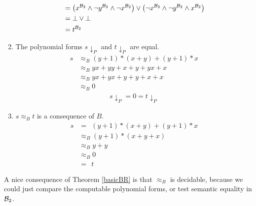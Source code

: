 \begin{enumerate}
\begin{align*}
				& =\left( x^{\mathcal{B}_2}\wedge\neg y^{\mathcal{B}_2}\wedge \neg x^{\mathcal{B}_2}\right)\vee\left( \neg x^{\mathcal{B}_2}\wedge \neg y^{\mathcal{B}_2}\wedge x^{\mathcal{B}_2}\right)                                                                                             \\
				& =\bot\vee\bot\\
				& =t^{\mathcal{B}_2} 
			\end{align*}
			\item The polynomial forms $s{\downarrow_P}$ and $t{\downarrow_P}$ are equal.
			\begin{align*}
				s & \approx_B (y+1)*(x+y)+(y+1)*x \\
				  & \approx_B yx+yy+x+y+yx+x    \\
				  & \approx_B yx+yx+y+y+x+x     \\
				  & \approx_B 0
			\end{align*}
			\begin{align*}
				s{\downarrow_P}=0=t{\downarrow_P}
			\end{align*}
			\item $s\approx_B t$ is a consequence of $B$.
			\begin{align*}
				s & =\ \ (y+1)*(x+y)+(y+1)*x \\
				  & \approx_B (y+1)*(x+y+x)      \\
				  & \approx_B y+y               \\
				  & \approx_B 0                 \\
				  & =\ \ t                 
			\end{align*}
		\end{enumerate}
		A nice consequence of Theorem \ref{basicBR} is that $\approx_B$ is decidable, because we could just compare the computable polynomial forms, or test semantic equality in ${\mathcal{B}_2}$.
